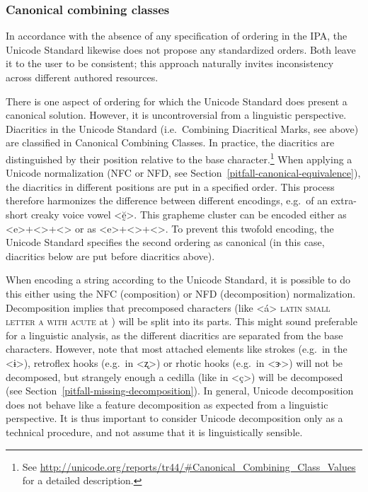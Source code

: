 \subsubsection*{Canonical combining classes}

In accordance with the absence of any specification of ordering in the IPA, the
Unicode Standard likewise does not propose any standardized orders. Both leave it
to the user to be consistent; this approach naturally invites inconsistency across 
different authored resources.

There is one aspect of ordering for which the Unicode Standard does present a
canonical solution. However, it is uncontroversial from a linguistic
perspective. Diacritics in the Unicode Standard (i.e.~Combining Diacritical
Marks, see above) are classified in Canonical Combining Classes. In practice,
the diacritics are distinguished by their position relative to the base
character.\footnote{See
\url{http://unicode.org/reports/tr44/#Canonical_Combining_Class_Values} for a
detailed description.} When applying a Unicode normalization (NFC or NFD, see
Section~\ref{pitfall-canonical-equivalence}), the diacritics in different
positions are put in a specified order. This process therefore harmonizes the
difference between different encodings, e.g.\ of an extra-short creaky voice
vowel <ḛ̆>. This grapheme cluster can be encoded either as
<e>+<>+<> or as <e>+<>+<>. To
prevent this twofold encoding, the Unicode Standard specifies the second
ordering as canonical (in this case, diacritics below are put before diacritics
above).

When encoding a string according to the Unicode Standard, it is possible to do
this either using the NFC (composition) or NFD (decomposition) normalization.
Decomposition implies that precomposed characters (like <á> \textsc{latin small
letter a with acute} at ) will be split into its parts. This might
sound preferable for a linguistic analysis, as the different diacritics are
separated from the base characters. However, note that most attached elements
like strokes (e.g.~in the <ɨ>), retroflex hooks (e.g.~in <ʐ>) or rhotic hooks
(e.g.~in <ɝ>) will not be decomposed, but strangely enough a cedilla (like in
<ç>) will be decomposed (see Section~\ref{pitfall-missing-decomposition}). In
general, Unicode decomposition does not behave like a feature decomposition as
expected from a linguistic perspective. It is thus important to consider Unicode
decomposition only as a technical procedure, and not assume that it is
linguistically sensible.

